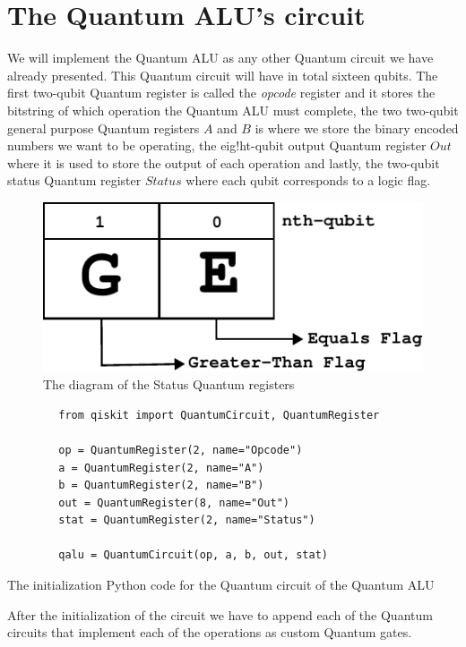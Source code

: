 \section{The Quantum ALU's circuit}

We will implement the Quantum ALU as any other Quantum circuit we have already presented. This Quantum circuit will have
in total sixteen qubits. The first two-qubit Quantum register is called the \textit{opcode} register and it stores the bitstring
of which operation the Quantum ALU must complete, the two two-qubit general purpose Quantum registers $A$ and $B$ is where
we store the binary encoded numbers we want to be operating, the eig!ht-qubit output Quantum register $Out$ where it is used to
store the output of each operation and lastly, the two-qubit status Quantum register $Status$ where each qubit corresponds to
a logic flag.

\begin{figure}[!ht]
    \centering
    \includegraphics[scale=0.8]{images/6_Complete_System/status_reg_diagram.pdf}
    \caption{The diagram of the Status Quantum registers}
\end{figure}

\begin{listing}[!ht]
    \centering
    \begin{verbatim}
        from qiskit import QuantumCircuit, QuantumRegister

        op = QuantumRegister(2, name="Opcode")
        a = QuantumRegister(2, name="A")
        b = QuantumRegister(2, name="B")
        out = QuantumRegister(8, name="Out")
        stat = QuantumRegister(2, name="Status")

        qalu = QuantumCircuit(op, a, b, out, stat)
    \end{verbatim}
    \caption{The initialization Python code for the Quantum circuit of the Quantum ALU}
\end{listing}

After the initialization of the circuit we have to append each of the Quantum circuits that implement each of the operations
as custom Quantum gates.

